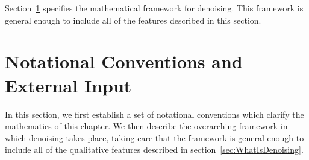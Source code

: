Section~\ref{sec:DenoisingNotationSetup} specifies the mathematical framework for denoising.  This framework is general enough to include all of the features described in this section.

\section{Notational Conventions and External Input}\label{sec:DenoisingNotationSetup}

In this section, we first establish a set of notational conventions which clarify the mathematics of this chapter.  We then describe the overarching framework in which denoising takes place, taking care that the framework is general enough to include all of the qualitative features described in section~\ref{sec:WhatIsDenoising}.

